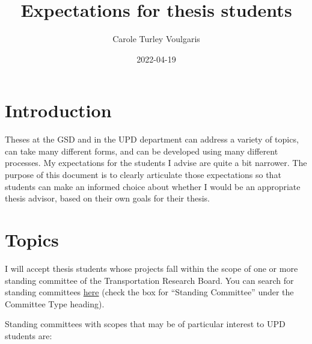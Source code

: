 \documentclass[]{tufte-book}
\title{Expectations for thesis students}
\author{Carole Turley Voulgaris}
\date{2022-04-19}
\begin{document}
\maketitle



{
\setcounter{tocdepth}{1}
\tableofcontents
}

\hypertarget{introduction}{%
\chapter{Introduction}\label{introduction}}

Theses at the GSD and in the UPD department can address a variety of topics, can take many different forms, and can be developed using many different processes. My expectations for the students I advise are quite a bit narrower. The purpose of this document is to clearly articulate those expectations so that students can make an informed choice about whether I would be an appropriate thesis advisor, based on their own goals for their thesis.

\hypertarget{topics}{%
\chapter{Topics}\label{topics}}

I will accept thesis students whose projects fall within the scope of one or more standing committee of the Transportation Research Board. You can search for standing committees \href{https://www.mytrb.org/OnlineDirectory/Committee/}{here} (check the box for ``Standing Committee'' under the Committee Type heading).

Standing committees with scopes that may be of particular interest to UPD students are:
\end{document}
